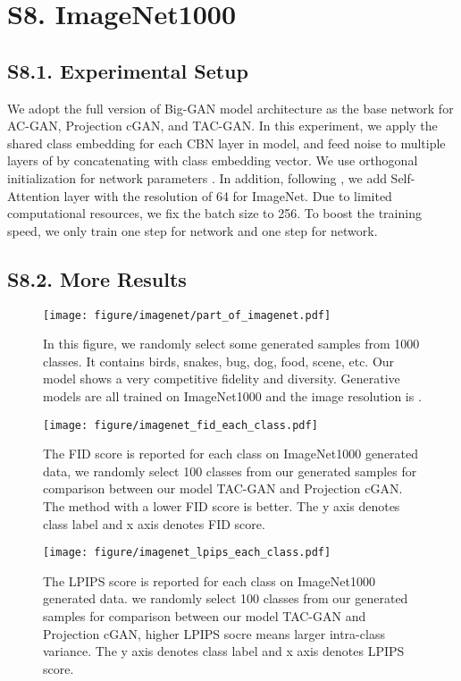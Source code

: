 \section*{S8. ImageNet1000}
\subsection*{S8.1. Experimental Setup}
We adopt the full version of Big-GAN model architecture as the base network for AC-GAN, Projection cGAN, and TAC-GAN. In this experiment, we apply the shared class embedding for each CBN layer in  model, and feed noise  to multiple layers of  by concatenating with class embedding vector. We use orthogonal initialization for network parameters \cite{brock2018large}. In addition, following \cite{brock2018large}, we add Self-Attention layer with the resolution of 64 for ImageNet. Due to limited computational resources, we fix the batch size to 256. To boost the training speed, we only train one step for  network and one step for  network.

\subsection*{S8.2. More Results}
\begin{figure}[H]
\centering\texttt{[image: figure/imagenet/part\_of\_imagenet.pdf]}
  \caption{In this figure, we randomly select some generated samples from 1000 classes. It contains birds, snakes, bug, dog, food, scene, etc. Our model shows a very competitive fidelity and diversity. Generative models are all trained on ImageNet1000 and the image resolution is .}
  \label{part_imagenet}
\end{figure}

\begin{figure}[H]
\vspace{-4cm}\hspace{-3cm}\texttt{[image: figure/imagenet\_fid\_each\_class.pdf]}
\vspace{-3.8cm}
  \caption{The FID score is reported for each class on ImageNet1000 generated data, we randomly select 100 classes from our generated samples for comparison between our model TAC-GAN and Projection cGAN. The method with a lower FID score is better. The y axis denotes class label and x axis denotes FID score.}
  \label{imagenet_fid_each_class}
\end{figure}

\begin{figure}[H]
\vspace{-4cm}\hspace{-3cm}\texttt{[image: figure/imagenet\_lpips\_each\_class.pdf]}
\vspace{-3.8cm}
  \caption{The LPIPS score is reported for each class on ImageNet1000 generated data. we randomly select 100 classes from our generated samples for comparison between our model TAC-GAN and Projection cGAN, higher LPIPS socre means larger intra-class variance. The y axis denotes class label and x axis denotes LPIPS score. }
  \label{imagenet_lpips_each_class}
\end{figure}


